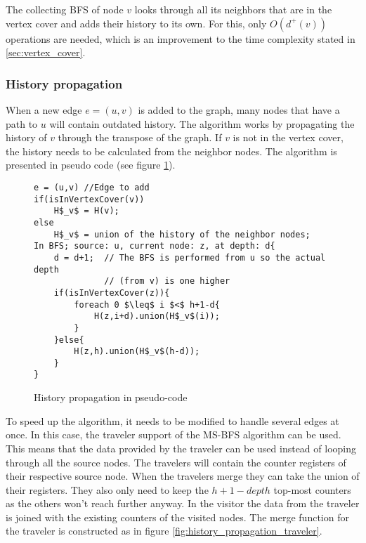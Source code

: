 The collecting BFS of node $v$ looks through all its neighbors that are in the vertex cover and adds their history to its own. For this, only $O(d^+(v))$ operations are needed, which is an improvement to the time complexity stated in \ref{sec:vertex_cover}. \\


\subsubsection{History propagation}

When a new edge $e = (u,v)$ is added to the graph, many nodes that have a path to $u$ will contain outdated history. The algorithm works by propagating the history of $v$ through the transpose of the graph. If $v$ is not in the vertex cover, the history needs to be calculated from the neighbor nodes. The algorithm is presented in pseudo code (see figure \ref{fig:history_propagation_algorithm}).

\begin{figure}[h]
    \begin{lstlisting}[mathescape]
e = (u,v) //Edge to add
if(isInVertexCover(v))
    H$_v$ = H(v);
else
    H$_v$ = union of the history of the neighbor nodes;
In BFS; source: u, current node: z, at depth: d{
    d = d+1;  // The BFS is performed from u so the actual depth 
              // (from v) is one higher
    if(isInVertexCover(z)){
        foreach 0 $\leq$ i $<$ h+1-d{
            H(z,i+d).union(H$_v$(i));
        }
    }else{
        H(z,h).union(H$_v$(h-d));
    }
}
    \end{lstlisting}
    \caption{History propagation in pseudo-code}
    \label{fig:history_propagation_algorithm}
\end{figure}

To speed up the algorithm, it needs to be modified to handle several edges at once. In this case, the traveler support of the MS-BFS algorithm can be used. This means that the data provided by the traveler can be used instead of looping through all the source nodes. The travelers will contain the counter registers of their respective source node. When the travelers merge they can take the union of their registers. They also only need to keep the $h+1-depth$ top-most counters as the others won't reach further anyway. In the visitor the data from the traveler is joined with the existing counters of the visited nodes. The merge function for the traveler is constructed as in figure \ref{fig:history_propagation_traveler}.

